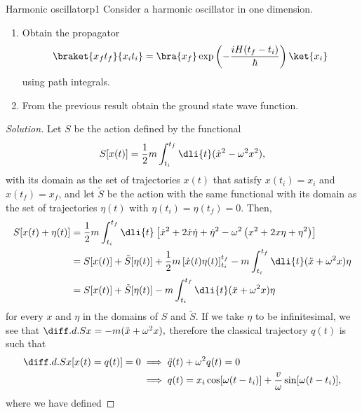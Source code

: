 \begin{problem}{Harmonic oscillator}{p1}
    Consider a harmonic oscillator in one dimension.
    \begin{enumerate}[label=(\alph*)]
       \item Obtain the propagator 
          \begin{equation*}
             \braket{x_ft_f}{x_it_i} = \bra{x_f}\exp\left(-\frac{iH(t_f - t_i)}{\hbar}\right)\ket{x_i}
          \end{equation*}
          using path integrals.
       \item From the previous result obtain the ground state wave function.
    \end{enumerate}
\end{problem}
\begin{proof}[Solution]
   Let \(S\) be the action defined by the functional
   \begin{equation*}
      S[x(t)] = \frac12 m \int_{t_i}^{t_f} \dli{t} (\dot{x}^2 - \omega^2 x^2),
   \end{equation*}
   with its domain as the set of trajectories \(x(t)\) that satisfy \(x(t_i) = x_i\) and \(x(t_f) = x_f\), and let \(\tilde{S}\) be the action with the same functional with its domain as the set of trajectories \(\eta(t)\) with \(\eta(t_i) = \eta(t_f) = 0.\) Then,
   \begin{align*}
      S[x(t) + \eta(t)]
      &= \frac12 m\int_{t_i}^{t_f} \dli{t} \left[ \dot{x}^2 + 2\dot{x} \dot{\eta} + \dot{\eta}^2 - \omega^2 \left(x^2 + 2x\eta + \eta^2\right)\right]\\
      &= S[x(t)] + \tilde{S}[\eta(t)] + \frac12 m \left[\dot{x}(t) \eta(t)\right]_{t_i}^{t_f} - m \int_{t_i}^{t_f} \dli{t} (\ddot{x} + \omega^2 x) \eta\\
      &= S[x(t)] + \tilde{S}[\eta(t)] - m \int_{t_i}^{t_f} \dli{t} (\ddot{x} + \omega^2 x) \eta
   \end{align*}
   for every \(x\) and \(\eta\) in the domains of \(S\) and \(\tilde{S}\). If we take \(\eta\) to be infinitesimal, we see that \(\diff.d.{S}{x} = -m(\ddot{x} + \omega^2 x),\) therefore the classical trajectory \(q(t)\) is such that 
   \begin{align*}
      \diff.d.{S}{x}[x(t) = q(t)] = 0 &\implies \ddot{q}(t) + \omega^2 q(t) = 0\\
                                      &\implies q(t) = x_i \cos[\omega (t - t_i)] + \frac{v}{\omega} \sin[\omega (t - t_i)],
   \end{align*}
   where we have defined

\end{proof}
